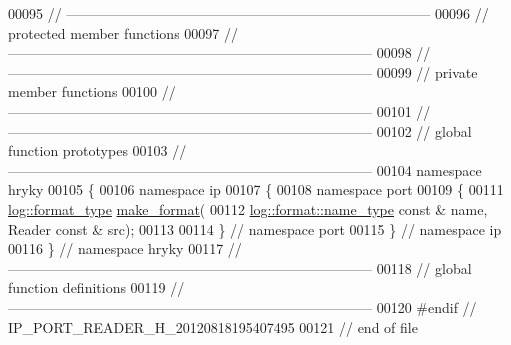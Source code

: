 \begin{DoxyCode}
00095 \textcolor{comment}{//
      ------------------------------------------------------------------------------}
00096 \textcolor{comment}{// protected member functions}
00097 \textcolor{comment}{//
      ------------------------------------------------------------------------------}
00098 \textcolor{comment}{//
      ------------------------------------------------------------------------------}
00099 \textcolor{comment}{// private member functions}
00100 \textcolor{comment}{//
      ------------------------------------------------------------------------------}
00101 \textcolor{comment}{//
      ------------------------------------------------------------------------------}
00102 \textcolor{comment}{// global function prototypes}
00103 \textcolor{comment}{//
      ------------------------------------------------------------------------------}
00104 \textcolor{keyword}{namespace }hryky
00105 \{
00106 \textcolor{keyword}{namespace }ip
00107 \{
00108 \textcolor{keyword}{namespace }port
00109 \{
00111     \hyperlink{namespacehryky_1_1log_ad50448c3f934f1eacd5c1bcffe8111e1}{log::format_type} \hyperlink{namespacehryky_afd615217f648ff164bc40fb82166d959}{make_format}(
00112         \hyperlink{namespacehryky_1_1log_1_1format_ab7408d1e2ed2d648dbf9bba69eb74288}{log::format::name_type} \textcolor{keyword}{const} & name, Reader \textcolor{keyword}{const} & src);
00113 
00114 \} \textcolor{comment}{// namespace port}
00115 \} \textcolor{comment}{// namespace ip}
00116 \} \textcolor{comment}{// namespace hryky}
00117 \textcolor{comment}{//
      ------------------------------------------------------------------------------}
00118 \textcolor{comment}{// global function definitions}
00119 \textcolor{comment}{//
      ------------------------------------------------------------------------------}
00120 \textcolor{preprocessor}{#endif // IP\_PORT\_READER\_H\_20120818195407495}
00121 \textcolor{preprocessor}{}\textcolor{comment}{// end of file}
\end{DoxyCode}

